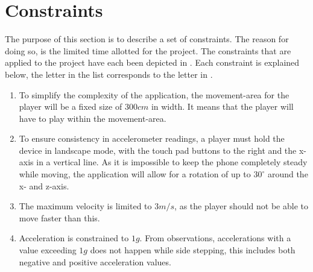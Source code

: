 \section{Constraints}\label{section:constraints}
The purpose of this section is to describe a set of constraints. 
The reason for doing so, is the limited time allotted for the project. 
The constraints that are applied to the project have each been depicted in .
Each constraint is explained below, the letter in the list corresponds to the letter in .  

\begin{enumerate}[label=(\alph*),itemsep=2pt,parsep=2pt]
\item To simplify the complexity of the application, the movement-area for the player will be a fixed size of $300 cm$ in width.
It means that the player will have to play within the movement-area.
\item To ensure consistency in accelerometer readings, a player must hold the device in landscape mode, with the touch pad buttons to the right and the x-axis in a vertical line. As it is impossible to keep the phone completely steady while moving, the application will allow for a rotation of up to $30^\circ$ around the x- and z-axis.
\item The maximum velocity is limited to $3 m/s$, as the player should not be able to move faster than this.
\item Acceleration is constrained to $1 g$. From observations, accelerations with a value exceeding $1 g$ does not happen while side stepping, this includes both negative and positive acceleration values.
\end{enumerate}


